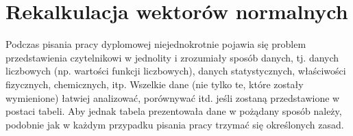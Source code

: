 \section{Rekalkulacja wektorów normalnych}

Podczas pisania pracy dyplomowej niejednokrotnie pojawia się problem przedstawienia czytelnikowi w jednolity i zrozumiały sposób danych, tj. danych liczbowych (np. wartości funkcji liczbowych), danych statystycznych,
właściwości fizycznych, chemicznych, itp. Wszelkie dane (nie tylko te, które zostały wymienione) łatwiej analizować, porównywać itd. jeśli zostaną przedstawione w postaci tabeli. Aby jednak tabela prezentowała dane w pożądany sposób należy, podobnie \pauza jak w każdym przypadku pisania pracy \pauza trzymać się określonych zasad.